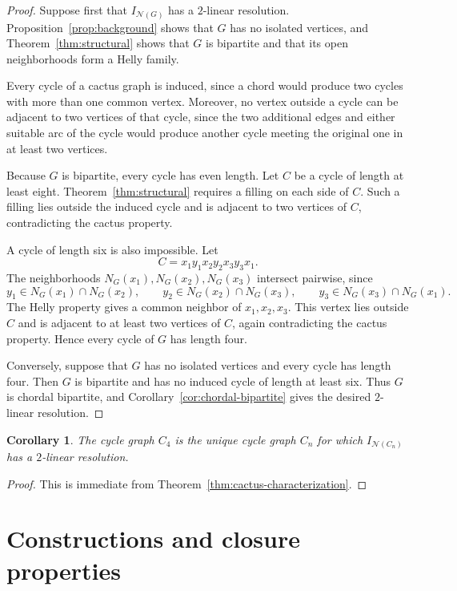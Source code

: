 \documentclass[10pt,a4paper]{amsart}
\newtheorem{corollary}[theorem]{Corollary}
\numberwithin{equation}{section}
\newcommand{\NN}{\mathcal N}
\begin{document}
	\begin{proof}
		Suppose first that \(I_{\NN(G)}\) has a \(2\)-linear resolution.
		Proposition~\ref{prop:background} shows that \(G\) has no isolated vertices,
		and Theorem~\ref{thm:structural} shows that \(G\) is bipartite and that its
		open neighborhoods form a Helly family.

		Every cycle of a cactus graph is induced, since a chord would produce two
		cycles with more than one common vertex. Moreover, no vertex outside a cycle
		can be adjacent to two vertices of that cycle, since the two additional edges
		and either suitable arc of the cycle would produce another cycle meeting the
		original one in at least two vertices.

		Because \(G\) is bipartite, every cycle has even length. Let \(C\) be a cycle
		of length at least eight. Theorem~\ref{thm:structural} requires a filling on
		each side of \(C\). Such a filling lies outside the induced cycle and is
		adjacent to two vertices of \(C\), contradicting the cactus property.

		A cycle of length six is also impossible. Let
		\[
		C=x_1y_1x_2y_2x_3y_3x_1.
		\]
		The neighborhoods \(N_G(x_1),N_G(x_2),N_G(x_3)\) intersect pairwise, since
		\[
		y_1\in N_G(x_1)\cap N_G(x_2),\qquad
		y_2\in N_G(x_2)\cap N_G(x_3),\qquad
		y_3\in N_G(x_3)\cap N_G(x_1).
		\]
		The Helly property gives a common neighbor of \(x_1,x_2,x_3\). This vertex
		lies outside \(C\) and is adjacent to at least two vertices of \(C\), again
		contradicting the cactus property. Hence every cycle of \(G\) has length four.

		Conversely, suppose that \(G\) has no isolated vertices and every cycle has
		length four. Then \(G\) is bipartite and has no induced cycle of length at
		least six. Thus \(G\) is chordal bipartite, and
		Corollary~\ref{cor:chordal-bipartite} gives the desired \(2\)-linear
		resolution.
	\end{proof}
	\begin{corollary}\label{cor:unique_cycle}
		The cycle graph \(C_4\) is the unique cycle graph \(C_n\) for which
		\(I_{\NN(C_n)}\) has a \(2\)-linear resolution.
	\end{corollary}
	
	\begin{proof}
		This is immediate from Theorem~\ref{thm:cactus-characterization}.
	\end{proof}
	
	\section{Constructions and closure properties}\label{sec:constructions}
	
\end{document}
